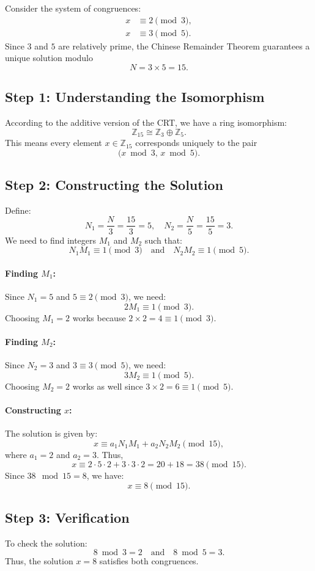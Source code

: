 \documentclass[12pt]{article}
\theoremstyle{definition} %
\theoremstyle{plain} %
\begin{document}
Consider the system of congruences:
\[
\begin{aligned}
x &\equiv 2 \pmod{3}, \\
x &\equiv 3 \pmod{5}.
\end{aligned}
\]
Since \(3\) and \(5\) are relatively prime, the Chinese Remainder Theorem guarantees a unique solution modulo 
\[
N = 3 \times 5 = 15.
\]

\subsection*{Step 1: Understanding the Isomorphism}

According to the additive version of the CRT, we have a ring isomorphism:
\[
\mathbb{Z}_{15} \cong \mathbb{Z}_3 \oplus \mathbb{Z}_5.
\]
This means every element \(x \in \mathbb{Z}_{15}\) corresponds uniquely to the pair 
\[
\bigl( x \bmod 3,\, x \bmod 5 \bigr).
\]

\subsection*{Step 2: Constructing the Solution}

Define:
\[
N_1 = \frac{N}{3} = \frac{15}{3} = 5, \quad N_2 = \frac{N}{5} = \frac{15}{5} = 3.
\]
We need to find integers \(M_1\) and \(M_2\) such that:
\[
N_1 M_1 \equiv 1 \pmod{3} \quad \text{and} \quad N_2 M_2 \equiv 1 \pmod{5}.
\]

\paragraph{Finding \(M_1\):}  
Since \(N_1 = 5\) and \(5 \equiv 2 \pmod{3}\), we need:
\[
2M_1 \equiv 1 \pmod{3}.
\]
Choosing \(M_1 = 2\) works because \(2 \times 2 = 4 \equiv 1 \pmod{3}\).

\paragraph{Finding \(M_2\):}  
Since \(N_2 = 3\) and \(3 \equiv 3 \pmod{5}\), we need:
\[
3M_2 \equiv 1 \pmod{5}.
\]
Choosing \(M_2 = 2\) works as well since \(3 \times 2 = 6 \equiv 1 \pmod{5}\).

\paragraph{Constructing \(x\):}  
The solution is given by:
\[
x \equiv a_1 N_1 M_1 + a_2 N_2 M_2 \pmod{15},
\]
where \(a_1 = 2\) and \(a_2 = 3\). Thus,
\[
x \equiv 2 \cdot 5 \cdot 2 + 3 \cdot 3 \cdot 2 = 20 + 18 = 38 \pmod{15}.
\]
Since \(38 \mod 15 = 8\), we have:
\[
x \equiv 8 \pmod{15}.
\]

\subsection*{Step 3: Verification}

To check the solution:
\[
8 \bmod 3 = 2 \quad \text{and} \quad 8 \bmod 5 = 3.
\]
Thus, the solution \(x = 8\) satisfies both congruences.
\end{document}
